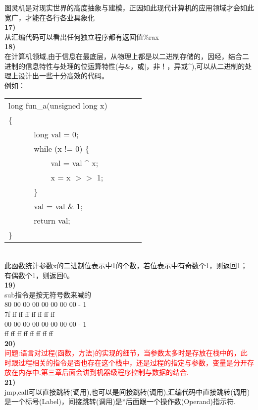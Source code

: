 \documentclass{article}
\newcommand{\red}[1]{\textcolor{red}{#1}}
\begin{document}
\begin{CJK}{UTF8}{uyhei}
图灵机是对现实世界的高度抽象与建模，正因如此现代计算机的应用领域才会如此宽广，才能在各行各业具象化	\\
\textbf{17)}	\\
从汇编代码可以看出任何独立程序都有返回值\%rax	\\
\textbf{18)}	\\
在计算机领域,由于信息在最底层，从物理上都是以二进制存储的，因经，结合二进制的信息特性与处理的位运算特性(与\&，或$|$，非！，异或\^{}),可以从二进制的处理上设计出一些十分高效的代码。	\\
例如：	\\[-2ex]
\begin{table}[ht]
\begin{tabular}{m{2em}m{2em}m{2em}l}
	\multicolumn{3}{l}{long fun\_a(unsigned long x)}	\\
\{	\\
	&	\multicolumn{3}{l}{long val = 0;}	\\
	&	\multicolumn{3}{l}{ while (x != 0) \{ } 	\\
	&	&	\multicolumn{2}{l}{val = val \^{} x;}	\\
	&	&	\multicolumn{2}{l}{x = x $>>$ 1;}	\\
	&	\multicolumn{3}{l}{ \} } 	\\
	&	\multicolumn{3}{l}{val = val \& 1;} 	\\
	&	\multicolumn{3}{l}{return val;} 	\\
\}	\\
\end{tabular}
\end{table}	\\
此函数统计参数x的二进制位表示中1的个数，若位表示中有奇数个1，则返回1；有偶数个1，则返回0。	\\[1ex]
\textbf{19)}	\\
sub指令是按无符号数来减的	\\
80 00 00 00 00 00 00 00 - 1	\\
7f ff ff ff ff ff ff ff		\\[2ex]
00 00 00 00 00 00 00 00 - 1	\\
ff ff ff ff ff ff ff ff		\\[1ex]
\textbf{20)}	\\
\red{ 问题:语言对过程(函数，方法)的实现的细节，当参数太多时是存放在栈中的，此时跟过程相关的指令是否也存在这个栈中，还是过程的指定与参数，变量是分开存放在内存中.第三章后面会讲到机器级程序控制与数据的结合. }	\\[1ex]
\textbf{21)}	\\
jmp,call可以直接跳转(调用),也可以是间接跳转(调用),汇编代码中直接跳转(调用)是一个标号(Label)，间接跳转(调用)是*后面跟一个操作数(Operand)指示符.	\\[1ex]

\end{CJK}
\end{document}
